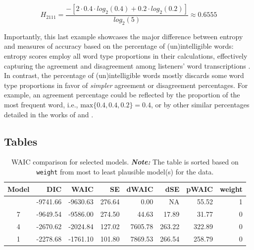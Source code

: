 \documentclass[
  authoryear,
  preprint,
  1p]{elsarticle}
\begin{document}
\[
H_{2111} = \frac{ -\left[ 2 \cdot 0.4 \cdot log_{2}(0.4) + 0.2 \cdot log_{2}(0.2) \right] }{ log_{2}(5)} \approx 0.6555
\]

{Importantly, this last example showcases the major difference between
entropy and measures of accuracy based on the percentage of
(un)intelligible words: entropy scores employ all word type proportions
in their calculations, effectively capturing the agreement and
disagreement among listeners' word transcriptions
\citep{Boonen_et_al_2023}. In contrast, the percentage of
(un)intelligible words mostly discards some word type proportions in
favor of \emph{simpler} agreement or disagreement percentages. For
example, an agreement percentage could be reflected by the proportion of
the most frequent word, i.e., \(\text{max}\{ 0.4, 0.4, 0.2 \}=0.4\), or
by other similar percentages detailed in the works of
\citet{Flipsen_2006} and \citet{Lagerberg_et_al_2014}.}

\newpage{}

\subsection{Tables}\label{sec-appB}

\begin{longtable}[]{@{}crrrrrrr@{}}

\caption{\label{tbl-rq1-waic}WAIC comparison for selected models.
{\textbf{\emph{Note:}} The table is sorted based on \texttt{weight} from
most to least plausible model(s) for the data.}}

\tabularnewline

\toprule\noalign{}
Model & DIC & WAIC & SE & dWAIC & dSE & pWAIC & weight \\
\midrule\noalign{}
\endhead
\bottomrule\noalign{}
\endlastfoot
10 & -9741.66 & -9630.63 & 276.64 & 0.00 & NA & 55.52 & 1 \\
7 & -9649.54 & -9586.00 & 274.50 & 44.63 & 17.89 & 31.77 & 0 \\
4 & -2670.62 & -2024.84 & 127.02 & 7605.78 & 263.22 & 322.89 & 0 \\
1 & -2278.68 & -1761.10 & 101.80 & 7869.53 & 266.54 & 258.79 & 0 \\

\end{longtable}
\end{document}
